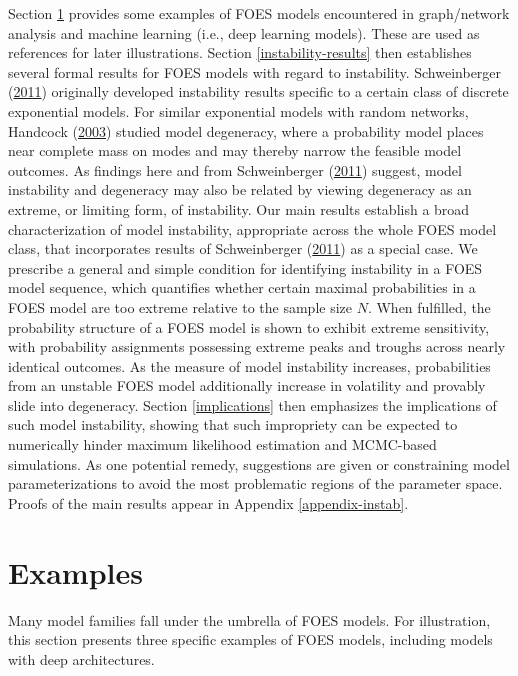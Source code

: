 \documentclass[]{article}
\theoremstyle{definition}
\begin{document}
Section \ref{examples} provides some examples of FOES models encountered
in graph/network analysis and machine learning (i.e., deep learning
models). These are used as references for later illustrations. Section
\ref{instability-results} then establishes several formal results for
FOES models with regard to instability. Schweinberger
(\protect\hyperlink{ref-schweinberger2011instability}{2011}) originally
developed instability results specific to a certain class of discrete
exponential models. For similar exponential models with random networks,
Handcock (\protect\hyperlink{ref-handcock2003assessing}{2003}) studied
model degeneracy, where a probability model places near complete mass on
modes and may thereby narrow the feasible model outcomes. As findings
here and from Schweinberger
(\protect\hyperlink{ref-schweinberger2011instability}{2011}) suggest,
model instability and degeneracy may also be related by viewing
degeneracy as an extreme, or limiting form, of instability. Our main
results establish a broad characterization of model instability,
appropriate across the whole FOES model class, that incorporates results
of Schweinberger
(\protect\hyperlink{ref-schweinberger2011instability}{2011}) as a
special case. We prescribe a general and simple condition for
identifying instability in a FOES model sequence, which quantifies
whether certain maximal probabilities in a FOES model are too extreme
relative to the sample size \(N\). When fulfilled, the probability
structure of a FOES model is shown to exhibit extreme sensitivity, with
probability assignments possessing extreme peaks and troughs across
nearly identical outcomes. As the measure of model instability
increases, probabilities from an unstable FOES model additionally
increase in volatility and provably slide into degeneracy. Section
\ref{implications} then emphasizes the implications of such model
instability, showing that such impropriety can be expected to
numerically hinder maximum likelihood estimation and MCMC-based
simulations. As one potential remedy, suggestions are given or
constraining model parameterizations to avoid the most problematic
regions of the parameter space. Proofs of the main results appear in
Appendix \ref{appendix-instab}.

\section{Examples}\label{examples}

Many model families fall under the umbrella of FOES models. For
illustration, this section presents three specific examples of FOES
models, including models with deep architectures.
\end{document}
